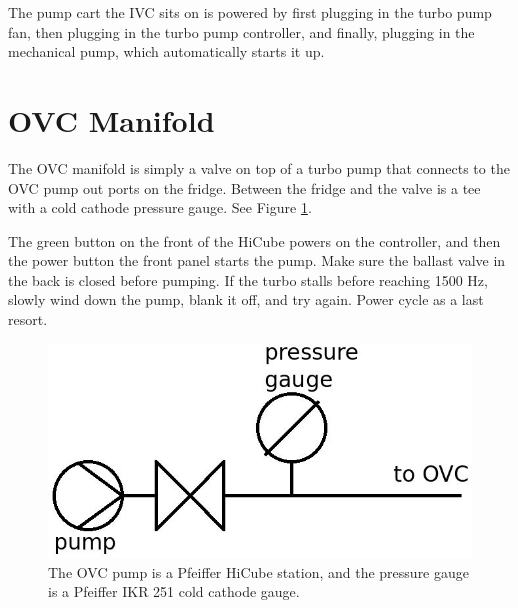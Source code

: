 The pump cart the IVC sits on is powered by first plugging in the turbo pump fan, then plugging in the turbo pump controller, and finally, plugging in the mechanical pump, which automatically starts it up.

\section{OVC Manifold}
The OVC manifold is simply a valve on top of a turbo pump that connects to the OVC pump out ports on the fridge.  Between the fridge and the valve is a tee with a cold cathode pressure gauge.  See Figure \ref{fig:ovc-manifold-diagram}.



The green button on the front of the HiCube powers on the controller, and then the power button the front panel starts the pump.  Make sure the ballast valve in the back is closed before pumping.  If the turbo stalls before reaching 1500 Hz, slowly wind down the pump, blank it off, and try again.  Power cycle as a last resort.

\begin{figure}[htbp!]
 \centering
 \includegraphics[width=.5\textwidth]{./img/ovc-manifold-diagram.jpg}
 \caption{The OVC pump is a Pfeiffer HiCube station, and the pressure gauge is a Pfeiffer IKR 251 cold cathode gauge.}
 \label{fig:ovc-manifold-diagram}
 
 
\end{figure}
